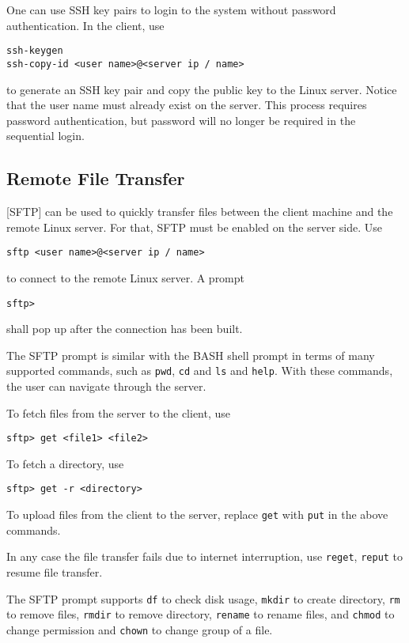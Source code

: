 One can use SSH key pairs to login to the system without password authentication. In the client, use
\begin{lstlisting}
ssh-keygen
ssh-copy-id <user name>@<server ip / name>
\end{lstlisting}
to generate an SSH key pair and copy the public key to the Linux server. Notice that the user name must already exist on the server. This process requires password authentication, but password will no longer be required in the sequential login.

\subsection{Remote File Transfer}

[SFTP] can be used to quickly transfer files between the client machine and the remote Linux server. For that, SFTP must be enabled on the server side. Use
\begin{lstlisting}
sftp <user name>@<server ip / name>
\end{lstlisting}
to connect to the remote Linux server. A prompt
\begin{lstlisting}
sftp>
\end{lstlisting}
shall pop up after the connection has been built.

The SFTP prompt is similar with the BASH shell prompt in terms of many supported commands, such as \verb|pwd|, \verb|cd| and \verb|ls| and \verb|help|. With these commands, the user can navigate through the server.

To fetch files from the server to the client, use
\begin{lstlisting}
sftp> get <file1> <file2>
\end{lstlisting}
To fetch a directory, use
\begin{lstlisting}
sftp> get -r <directory>
\end{lstlisting}
To upload files from the client to the server, replace \verb|get| with \verb|put| in the above commands.

In any case the file transfer fails due to internet interruption, use \verb|reget|, \verb|reput| to resume file transfer.

The SFTP prompt supports \verb|df| to check disk usage, \verb|mkdir| to create directory, \verb|rm| to remove files, \verb|rmdir| to remove directory, \verb|rename| to rename files, and \verb|chmod| to change permission and \verb|chown| to change group of a file.
 











